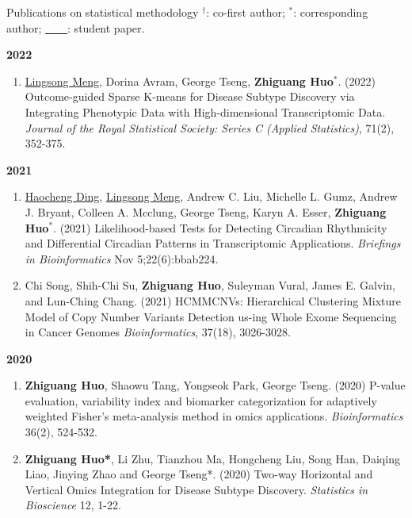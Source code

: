 \documentclass{resume} %
\begin{document}
\begin{rSection}{Publications on statistical methodology}
$^\dagger$: co-first author; $^*$: corresponding author; \underline{\mbox{ }\mbox{ }\mbox{ }\mbox{ }}: student paper.

\textbf{2022}
\begin{enumerate}[noitemsep,topsep=0pt, resume]

\item
\underline{Lingsong Meng}, Dorina Avram, George Tseng, {\bf Zhiguang Huo}$^*$.  (2022)
Outcome-guided Sparse K-means for Disease Subtype Discovery via Integrating Phenotypic Data with High-dimensional Transcriptomic Data.
\emph{Journal of the Royal Statistical Society: Series C (Applied Statistics)}, 71(2), 352-375.

\end{enumerate}


\textbf{2021}
\begin{enumerate}[noitemsep,topsep=0pt, resume]

\item
\underline{Haocheng Ding}, \underline{Lingsong Meng}, Andrew C. Liu, Michelle L. Gumz, Andrew J. Bryant, Colleen A. Mcclung, George Tseng, Karyn A. Esser, {\bf Zhiguang Huo}$^*$.  (2021)
Likelihood-based Tests for Detecting Circadian Rhythmicity and Differential Circadian Patterns in Transcriptomic Applications. 
\emph{Briefings in Bioinformatics} Nov 5;22(6):bbab224.

\item  
Chi Song, Shih-Chi Su, {\bf Zhiguang Huo}, Suleyman Vural, James E. Galvin, and Lun-Ching Chang. (2021) 
HCMMCNVs: Hierarchical Clustering Mixture Model of Copy Number Variants Detection us-ing Whole Exome Sequencing in Cancer Genomes
\emph{Bioinformatics}, 37(18), 3026-3028.

\end{enumerate}

\textbf{2020}
\begin{enumerate}[noitemsep,topsep=0pt, resume]

\item  {\bf  Zhiguang Huo}, Shaowu Tang, Yongseok Park, George Tseng. (2020) 
P-value evaluation, variability index and biomarker categorization for adaptively weighted Fisher's meta-analysis method in omics applications. 
\emph{Bioinformatics} 36(2), 524-532.

\item {\bf  Zhiguang Huo*}, Li Zhu, Tianzhou Ma, Hongcheng Liu, Song Han, Daiqing Liao, Jinying Zhao and George Tseng*.  (2020)
Two-way Horizontal and Vertical Omics Integration for Disease Subtype Discovery. \emph{Statistics in Bioscience} 12, 1-22.


\end{enumerate}
\end{rSection}
\end{document}
